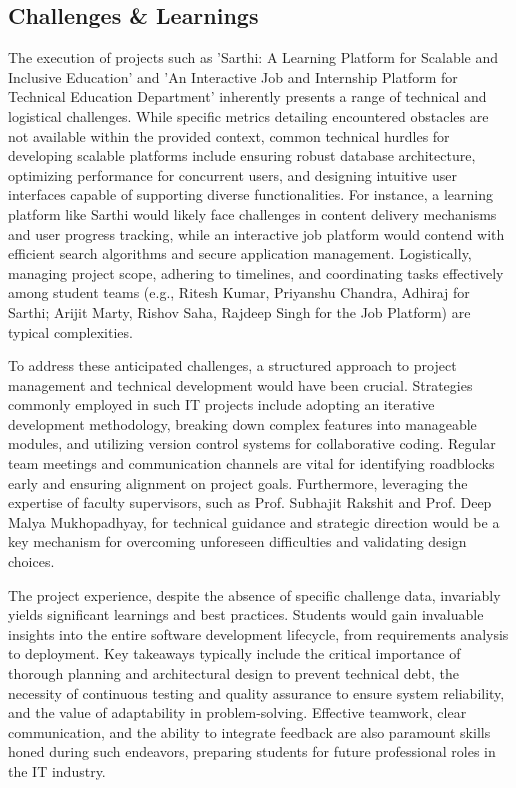 \documentclass[11pt,a4paper]{article}
\newenvironment{card}{
    \begin{tcolorbox}[
        enhanced,
        colback=cardback,
        colframe=border,
        sharp corners,
        boxrule=0.5pt,
        drop shadow,
        drop shadow={shadow xshift=1mm,shadow yshift=-1mm,fill=border!50},
        boxsep=3mm,
        left=5mm, right=5mm, top=5mm, bottom=5mm,
        width=\textwidth,
        nobeforeafter
    ]
}{\end{tcolorbox}}
\begin{document}
\begin{card}
    \subsection*{\textcolor{accent}{Challenges \& Learnings}}
    \vspace{0.3cm}
    The execution of projects such as 'Sarthi: A Learning Platform for Scalable and Inclusive Education' and 'An Interactive Job and Internship Platform for Technical Education Department' inherently presents a range of technical and logistical challenges. While specific metrics detailing encountered obstacles are not available within the provided context, common technical hurdles for developing scalable platforms include ensuring robust database architecture, optimizing performance for concurrent users, and designing intuitive user interfaces capable of supporting diverse functionalities. For instance, a learning platform like Sarthi would likely face challenges in content delivery mechanisms and user progress tracking, while an interactive job platform would contend with efficient search algorithms and secure application management. Logistically, managing project scope, adhering to timelines, and coordinating tasks effectively among student teams (e.g., Ritesh Kumar, Priyanshu Chandra, Adhiraj for Sarthi; Arijit Marty, Rishov Saha, Rajdeep Singh for the Job Platform) are typical complexities.

    To address these anticipated challenges, a structured approach to project management and technical development would have been crucial. Strategies commonly employed in such IT projects include adopting an iterative development methodology, breaking down complex features into manageable modules, and utilizing version control systems for collaborative coding. Regular team meetings and communication channels are vital for identifying roadblocks early and ensuring alignment on project goals. Furthermore, leveraging the expertise of faculty supervisors, such as Prof. Subhajit Rakshit and Prof. Deep Malya Mukhopadhyay, for technical guidance and strategic direction would be a key mechanism for overcoming unforeseen difficulties and validating design choices.

    The project experience, despite the absence of specific challenge data, invariably yields significant learnings and best practices. Students would gain invaluable insights into the entire software development lifecycle, from requirements analysis to deployment. Key takeaways typically include the critical importance of thorough planning and architectural design to prevent technical debt, the necessity of continuous testing and quality assurance to ensure system reliability, and the value of adaptability in problem-solving. Effective teamwork, clear communication, and the ability to integrate feedback are also paramount skills honed during such endeavors, preparing students for future professional roles in the IT industry.
\end{card}
\end{document}

